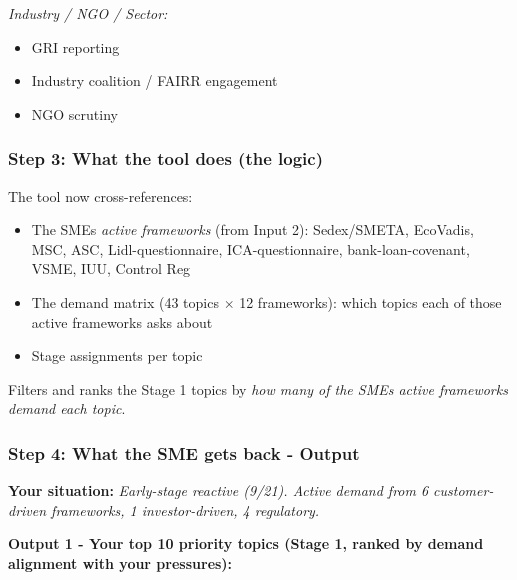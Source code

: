 \documentclass[
]{article}
\begin{document}
\emph{Industry / NGO / Sector:}

\begin{itemize}
\item[$\square$]
  GRI reporting
\item[$\square$]
  Industry coalition / FAIRR engagement
\item[$\square$]
  NGO scrutiny
\end{itemize}

\subsubsection{Step 3: What the tool does (the
logic)}\label{step-3-what-the-tool-does-the-logic}

The tool now cross-references:

\begin{itemize}
\item
  The SME\textquotesingle s \emph{active frameworks} (from Input 2):
  Sedex/SMETA, EcoVadis, MSC, ASC, Lidl-questionnaire,
  ICA-questionnaire, bank-loan-covenant, VSME, IUU, Control Reg
\item
  The demand matrix (43 topics $\times$ 12 frameworks): which topics each of
  those active frameworks asks about
\item
  Stage assignments per topic
\end{itemize}

Filters and ranks the Stage 1 topics by \emph{how many of the
SME\textquotesingle s active frameworks demand each topic}.

\subsubsection{Step 4: What the SME gets back - Output}\label{step-4-what-the-sme-gets-back-output}

\textbf{Your situation:} \emph{Early-stage reactive (9/21). Active
demand from 6 customer-driven frameworks, 1 investor-driven, 4
regulatory.}

\textbf{Output 1 - Your top 10 priority topics (Stage 1, ranked by
demand alignment with your pressures):}
\end{document}
